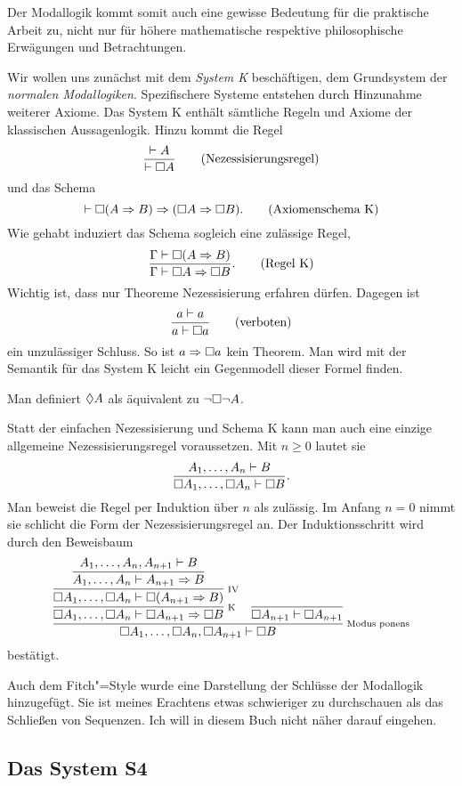 Der Modallogik kommt somit auch eine gewisse Bedeutung für die praktische
Arbeit zu, nicht nur für höhere mathematische respektive philosophische
Erwägungen und Betrachtungen.

Wir wollen uns zunächst mit dem \emph{System K} beschäftigen, dem
Grundsystem der \emph{normalen Modallogiken}. Spezifischere Systeme
entstehen durch Hinzunahme weiterer Axiome. Das System K enthält
sämtliche Regeln und Axiome der klassischen Aussagenlogik. Hinzu kommt
die Regel
\[\dfrac{\vdash A}{\vdash\Box A}\qquad\text{(Nezessisierungsregel)}\]
und das Schema
\[\vdash\Box(A\Rightarrow B)\Rightarrow (\Box A\Rightarrow\Box B).\qquad\text{(Axiomenschema K)}\]
Wie gehabt induziert das Schema sogleich eine zulässige Regel,
\[\dfrac{\Gamma\vdash\Box(A\Rightarrow B)}{\Gamma\vdash\Box A\Rightarrow\Box B}.\qquad\text{(Regel K)}\]
Wichtig ist, dass nur Theoreme Nezessisierung erfahren dürfen.
Dagegen ist
\[\dfrac{a\vdash a}{a\vdash\Box a}\qquad \text{(verboten)}\]
ein unzulässiger Schluss. So ist $a\Rightarrow\Box a$ kein Theorem. Man wird
mit der Semantik für das System K leicht ein Gegenmodell dieser Formel
finden.

Man definiert $\Diamond A$ als äquivalent zu $\lnot\Box\lnot A$.

Statt der einfachen Nezessisierung und Schema K kann man auch eine
einzige allgemeine Nezessisierungsregel voraussetzen. Mit $n\ge 0$
lautet sie
\[\dfrac{A_1,\ldots,A_n\vdash B}{\Box A_1,\ldots,\Box A_n\vdash\Box B}.\]
Man beweist die Regel per Induktion über $n$ als zulässig. Im Anfang $n=0$
nimmt sie schlicht die Form der Nezessisierungsregel an. Der
Induktionsschritt wird durch den Beweisbaum
\[
\infer[\infernote{Modus ponens}]{\lnec A_1,\ldots,\lnec A_n,\lnec A_{n+1}\vdash\lnec B}{
  \infer[\infernote{K}]{\lnec A_1,\ldots,\lnec A_n\vdash\lnec A_{n+1}\cond\lnec B}{
    \infer[\infernote{IV}]{\lnec A_1,\ldots,\lnec A_n\vdash\lnec (A_{n+1}\cond B)}{
      \infer{A_1,\ldots,A_n\vdash A_{n+1}\cond B}{
        A_1,\ldots,A_n,A_{n+1}\vdash B}}}
& \infer{\lnec A_{n+1}\vdash\lnec A_{n+1}}{}}
\]
bestätigt.

Auch dem Fitch"=Style wurde eine Darstellung der Schlüsse der Modallogik
hinzugefügt. Sie ist meines Erachtens etwas schwieriger zu durchschauen
als das Schließen von Sequenzen. Ich will in diesem Buch nicht näher
darauf eingehen.

\subsection{Das System S4}

